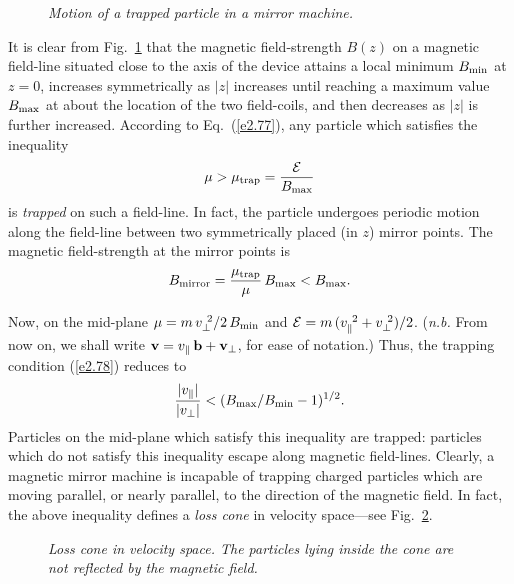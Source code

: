 \begin{figure}
\epsfysize=2.5in
\centerline{}
\caption{\em Motion of a trapped particle in a mirror machine.}\label{f1}
\end{figure}

It is clear from Fig.~\ref{f1} that the magnetic field-strength $B(z)$ 
on a magnetic field-line situated close to the axis of the device attains a
local minimum $B_{\rm min}$ at $z=0$,  increases symmetrically
 as  $|z|$ increases until
reaching a maximum value $B_{\rm max}$ at about the location of the two
field-coils, and then decreases as $|z|$ is further increased. According to
Eq.~(\ref{e2.77}), any particle which satisfies the inequality
\begin{equation}\label{e2.78}
\mu> \mu_{\rm trap}  = \frac{{\cal E}}{B_{\rm max}}
\end{equation}
is {\em trapped}\/ on such a  field-line. In fact, the particle undergoes
periodic motion along the field-line between two symmetrically placed (in $z$)
mirror points. The magnetic field-strength at the mirror points is
\begin{equation}
B_{\rm mirror} = \frac{\mu_{\rm trap}}{\mu}\,B_{\rm max} < B_{\rm max}.
\end{equation}

Now, on the mid-plane $\mu = m\, v_\perp^{~2}/2\, B_{\rm min}$ and
${\cal E} = m\,(v_\parallel^{~2} + v_\perp^{~2})/2$. 
({\em n.b.}\/ From now on, we shall write ${\bf v} = v_\parallel\,{\bf b} +
{\bf v}_\perp$, for ease of notation.)  Thus, the trapping
condition (\ref{e2.78}) reduces to
\begin{equation}\label{e2.80}
\frac{|v_\parallel|}{|v_\perp|} < (B_{\rm max}/B_{\rm min} - 1)^{1/2}.
\end{equation}
Particles on the mid-plane which satisfy this inequality are trapped: particles
which do not satisfy this inequality escape along magnetic field-lines.
Clearly, a magnetic mirror machine is incapable of trapping charged particles which
are moving parallel, or nearly parallel, to the direction of the magnetic field.
In fact, the above inequality defines a {\em loss cone}\/ in velocity space---see
Fig.~\ref{f2}. 

\begin{figure}
\epsfysize=2.5in
\centerline{}
\caption{\em Loss cone in velocity space. The particles lying inside the cone are
not reflected by the magnetic field.}\label{f2}
\end{figure}


